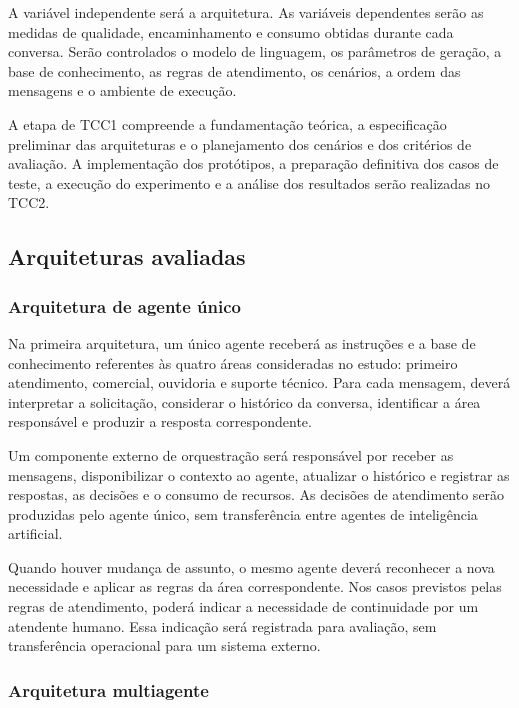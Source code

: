 A variável independente será a arquitetura. As variáveis dependentes serão as medidas de qualidade, encaminhamento e consumo obtidas durante cada conversa. Serão controlados o modelo de linguagem, os parâmetros de geração, a base de conhecimento, as regras de atendimento, os cenários, a ordem das mensagens e o ambiente de execução.

A etapa de TCC1 compreende a fundamentação teórica,
a especificação preliminar das arquiteturas e o planejamento
dos cenários e dos critérios de avaliação. A implementação
dos protótipos, a preparação definitiva dos casos de teste,
a execução do experimento e a análise dos resultados serão
realizadas no TCC2.

\subsection{Arquiteturas avaliadas}\label{subsec:arquiteturas-avaliadas}

\subsubsection{Arquitetura de agente único}
\label{subsubsec:agente-unico}

Na primeira arquitetura, um único agente receberá as instruções
e a base de conhecimento referentes às quatro áreas consideradas 
no estudo: primeiro atendimento, comercial, ouvidoria e suporte
técnico. Para cada mensagem, deverá interpretar a solicitação,
considerar o histórico da conversa, identificar a área responsável
e produzir a resposta correspondente.

Um componente externo de orquestração será responsável por receber
as mensagens, disponibilizar o contexto ao agente, atualizar o
histórico e registrar as respostas, as decisões e o consumo de
recursos. As decisões de atendimento serão produzidas pelo agente
único, sem transferência entre agentes de inteligência artificial.

Quando houver mudança de assunto, o mesmo agente deverá reconhecer
a nova necessidade e aplicar as regras da área correspondente.
Nos casos previstos pelas regras de atendimento, poderá indicar
a necessidade de continuidade por um atendente humano. Essa
indicação será registrada para avaliação, sem transferência
operacional para um sistema externo.

\subsubsection{Arquitetura multiagente}
\label{subsubsec:multiagente}

